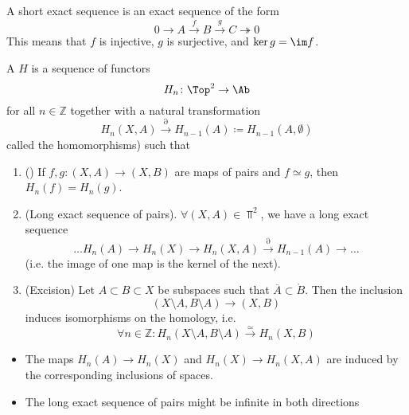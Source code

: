 \begin{comment}
\begin{trivial*}
    Note that the last property used is just that injective maps of spaces are monic in $\Top$ (which is trivial). 
\end{trivial*}
\end{comment}

\begin{aside}
    A short exact sequence is an exact sequence of the form
    \[
    0 \to  A \stackrel{f}{\longrightarrow} B \stackrel{g}{\longrightarrow} C \twoheadrightarrow 0
    \] 
    This means that $f$ is injective,  $g$ is surjective, and  $\ker g = \im f$.
\end{aside}

\begin{definition}\label{def:homology-theory}
    A  $H$ is a sequence of functors 
    \[
    H_n\colon \Top^2 \to  \Ab
    \]
    for all $n\in \mathbb{Z}$ together with a natural transformation
    \[
        H_n(X,A) \stackrel{\partial}{\longrightarrow} H_{n-1}(A) \coloneqq  H_{n-1}(A,\emptyset)
    \] 
    called the  homomorphisms) such that
    \begin{enumerate}[1)]
        \item () If $f,g\colon (X,A) \to  (X,B)$ are maps of pairs and $f\simeq g$, then  $H_n(f) = H_n(g)$.
        \item (Long exact sequence of pairs). $\forall (X,A) \in \Top^2$, we have a long exact sequence 
            \[
\ldots                H_n(A) \to H_n(X) \to H_n(X,A) \stackrel{\partial}{\longrightarrow} H_{n-1}(A) \to  \ldots
            \] 
            (i.e. the image of one map is the kernel of the next).
        \item (Excision) Let $A\subset B\subset X$ be subspaces such that $\overline{A}\subset \mathring{B}$. Then the inclusion
            \[
                (X \setminus A, B\setminus A) \to  (X,B)
            \] 
            induces isomorphisms on the homology, i.e.
            \[
  \forall n\in \mathbb{Z}\colon H_n(X \setminus A, B\setminus A) \stackrel{\simeq}{\longrightarrow}  H_n(X,B)
            \] 
    \end{enumerate}
\end{definition}

\begin{dremark}
    \begin{itemize}
        \item The maps $H_n(A) \to H_n(X) $ and $H_n(X) \to  H_n(X,A)$ are induced by the corresponding inclusions of spaces.
        \item The long exact sequence of pairs might be infinite in both directions
    \end{itemize}
\end{dremark}

